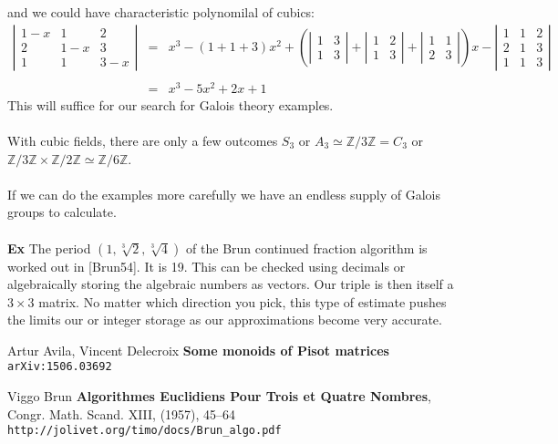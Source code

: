 \documentclass[12pt]{article}
\begin{document}
and we could have characteristic polynomilal of cubics:
\begin{eqnarray*}
\left|
\begin{array}{lll} 
1 -x& 1 & 2 \\
2 & 1-x & 3 \\
1 & 1 & 3-x
\end{array} \right| 
&=&  x^3 -(1+1+3)x^2 +\left( \left|
\begin{array}{cc}
1 & 3 \\ 1 & 3 \end{array} \right|
+ 
\left|
\begin{array}{cc}
1 & 2 \\ 1 & 3 \end{array} \right| 
+
\left|
\begin{array}{cc}
1 & 1 \\ 2 & 3 \end{array} \right|\right) x -
\left|
\begin{array}{ccc} 
1 & 1 & 2 \\
2 & 1 & 3 \\
1 & 1 & 3
\end{array} \right| \\ \\
&=& x^3 - 5 x^2 + 2x + 1
\end{eqnarray*}
This will suffice for our search for Galois theory examples. \\ \\  With cubic fields, there are only a few outcomes $S_3$ or $A_3 \simeq \mathbb{Z}/3\mathbb{Z} = C_3$ or $\mathbb{Z}/3\mathbb{Z} \times \mathbb{Z}/2\mathbb{Z} \simeq \mathbb{Z}/6\mathbb{Z}$. \\\\ If we can do the examples more carefully we have an endless supply of Galois groups to calculate. \\ \\
\noindent \textbf{Ex} The period $(1, \sqrt[3]{2}, \sqrt[3]{4})$ of the Brun continued fraction algorithm is worked out in [Brun54].  It is 19.  This can be checked using decimals or algebraically storing the algebraic numbers as vectors.  Our triple is then itself a $3 \times 3$ matrix.  No matter which direction you pick, this type of estimate pushes the limits our or integer storage as our approximations become very accurate.

\begin{thebibliography}{}

\item Artur Avila, Vincent Delecroix \textbf{Some monoids of Pisot matrices}  \texttt{arXiv:1506.03692}
\item Viggo Brun \textbf{Algorithmes Euclidiens Pour Trois et Quatre Nombres}, Congr. Math. Scand. XIII, (1957), 45–64 \texttt{http://jolivet.org/timo/docs/Brun\_{}algo.pdf}
 
\end{thebibliography} 
\end{document}
